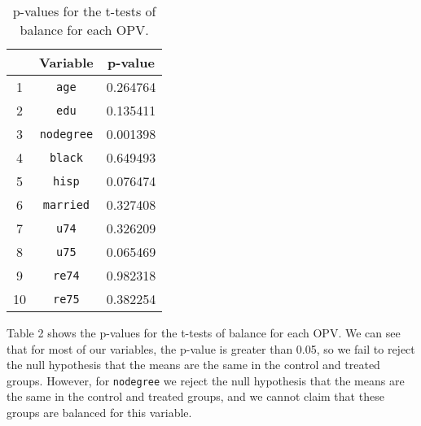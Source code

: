 \documentclass[
]{article}
\begin{document}
\begin{table}
\centering
\begin{tabular}{ccc}
\hline
& \textbf{Variable} & \textbf{p-value} \\ \hline
1 & \texttt{age}      & 0.264764         \\
2 & \texttt{edu}      & 0.135411         \\
3 & \texttt{nodegree} & 0.001398         \\
4 & \texttt{black}    & 0.649493         \\
5 & \texttt{hisp}     & 0.076474         \\
6 & \texttt{married}  & 0.327408         \\
7 & \texttt{u74}      & 0.326209         \\
8 & \texttt{u75}      & 0.065469         \\
9 & \texttt{re74}     & 0.982318         \\
10 & \texttt{re75}    & 0.382254         \\ \hline
\end{tabular}
\caption{p-values for the t-tests of balance for each OPV.}
\end{table}

Table 2 shows the p-values for the t-tests of balance for each OPV.
\newline  We can see that for most of our variables, the p-value is
greater than 0.05, so we fail to reject the null hypothesis that the
means are the same in the control and treated groups. However, for
\texttt{nodegree} we reject the null hypothesis that the means are the
same in the control and treated groups, and we cannot claim that these
groups are balanced for this variable.

\newpage
\end{document}
